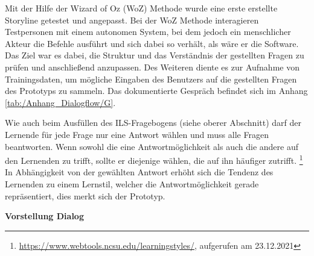 Mit der Hilfe der Wizard of Oz (WoZ) Methode wurde
eine erste erstellte Storyline getestet und angepasst. Bei der WoZ Methode interagieren Testpersonen 
mit einem autonomen System, bei dem jedoch ein menschlicher Akteur die Befehle ausführt 
und sich dabei so verhält, als wäre er die Software. \parencite[27]{Kelley.1984}
Das Ziel war es dabei, die Struktur und das Verständnis der gestellten Fragen zu prüfen und anschließend anzupassen.
Des Weiteren diente es zur Aufnahme von Trainingsdaten, um mögliche Eingaben des Benutzers auf die gestellten Fragen des Prototyps zu sammeln.
Das dokumentierte Gespräch befindet sich im Anhang \ref{tab:/Anhang_Dialogflow/G}.

Wie auch beim Ausfüllen des ILS-Fragebogens (siehe oberer Abschnitt) darf der Lernende für jede Frage nur eine Antwort wählen und muss alle Fragen beantworten. Wenn sowohl 
die eine Antwortmöglichkeit als auch die andere auf den Lernenden zu trifft, sollte er diejenige wählen, 
die auf ihn häufiger zutrifft. \footnote{\url{https://www.webtools.ncsu.edu/learningstyles/}, aufgerufen am 23.12.2021} 
In Abhängigkeit von der gewählten Antwort erhöht sich die Tendenz des Lernenden zu einem Lernstil, welcher die Antwortmöglichkeit 
gerade repräsentiert, dies merkt sich der Prototyp.



\textbf{Vorstellung Dialog} 

